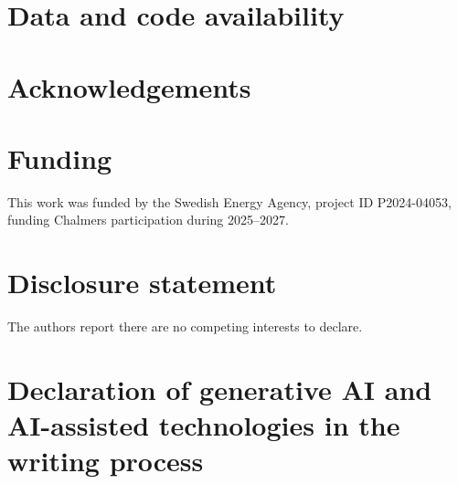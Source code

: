 \section*{Data and code availability}


\section*{Acknowledgements}


\section*{Funding}
This work was funded by the Swedish Energy Agency, project ID P2024-04053, funding Chalmers participation during 2025--2027.

\providecommand{\disclosureheading}{Disclosure statement}
\section*{\disclosureheading}
The authors report there are no competing interests to declare.

\section*{Declaration of generative AI and AI-assisted technologies in the writing process}

